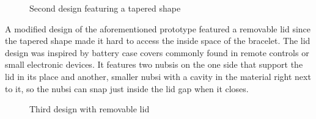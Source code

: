 \begin{figure}[bth]
	\myfloatalign
	 \quad
	\caption{Second design featuring a tapered shape}
\end{figure}

A modified design of the aforementioned prototype featured a removable lid since the tapered shape made it hard to access the inside space of the bracelet. The lid design was inspired by battery case covers commonly found in remote controls or small electronic devices. It features two nubsis on the one side that support the lid in its place and another, smaller nubsi with a cavity in the material right next to it, so the nubsi can snap just inside the lid gap when it closes.

\begin{figure}[bth]
	\myfloatalign
	 \quad
	\caption{Third design with removable lid}
\end{figure}

